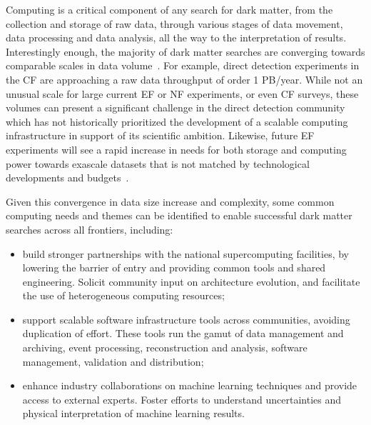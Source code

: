 \documentclass[nofootinbib]{article}
\begin{document}
Computing is a critical component of any search for dark matter, from the collection and storage of raw data, through various stages of data movement, data processing and data analysis, all the way to the interpretation of results. 
Interestingly enough, the majority of dark matter searches are converging towards comparable scales in data volume~\cite{SmallExperiments,CF1-WG4-Report}. For example, direct detection experiments in the CF are approaching a raw data throughput of order 1 PB/year. 
While not an unusual scale for large current EF or NF experiments, or even CF surveys, 
these volumes can present a significant challenge in the direct detection community which has not historically prioritized the development of a scalable computing infrastructure in support of its scientific ambition. 
Likewise, future EF experiments will see a rapid increase in needs for both storage and computing power towards exascale datasets that is not matched by technological developments and budgets~\cite{HEPSoftwareFoundation:2017ggl}. 


Given this convergence in data size increase and complexity, some common computing needs and themes can be identified to enable successful dark matter searches across all frontiers, including: 

\begin{itemize}
\item build stronger partnerships with the national supercomputing facilities, by lowering the barrier of entry and providing common tools and shared engineering. Solicit community input on architecture evolution, and facilitate the use of heterogeneous computing resources;
\item support scalable software infrastructure tools across communities, avoiding duplication of effort. These tools run the gamut of data management and archiving, event processing, reconstruction and analysis, software management, validation and distribution;
\item enhance industry collaborations on machine learning techniques and provide access to external experts. Foster efforts to understand uncertainties and physical interpretation of machine learning results.
\end{itemize}
\end{document}
